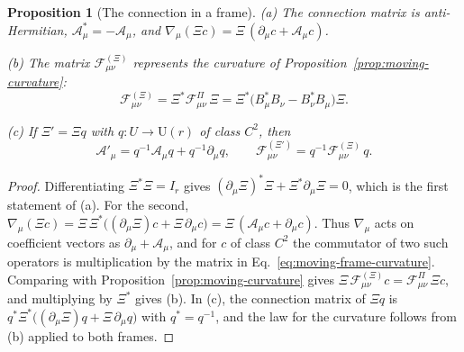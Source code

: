 \documentclass[11pt]{article}
\newtheorem{proposition}{Proposition}[section]
\theoremstyle{definition}
\begin{document}
\begin{proposition}[The connection in a frame]
\label{prop:moving-frame}
\textup{(a)} The connection matrix is anti-Hermitian, $\mathcal A_\mu^*=-\mathcal A_\mu$, and $\nabla_\mu(\Xi c)=\Xi\,(\partial_\mu c+\mathcal A_\mu c)$.

\textup{(b)} The matrix $\mathcal F^{(\Xi)}_{\mu\nu}$ represents the curvature of Proposition~\ref{prop:moving-curvature}:
\begin{equation}
 \mathcal F^{(\Xi)}_{\mu\nu}=\Xi^*\mathcal F^\Pi_{\mu\nu}\,\Xi=\Xi^*\bigl(B_\mu^*B_\nu-B_\nu^*B_\mu\bigr)\Xi .
 \label{eq:moving-frame-covariance}
\end{equation}

\textup{(c)} If $\Xi'=\Xi q$ with $q:U\to\mathrm U(r)$ of class $C^2$, then
\begin{equation}
 \mathcal A'_\mu=q^{-1}\mathcal A_\mu q+q^{-1}\partial_\mu q,\qquad
 \mathcal F^{(\Xi')}_{\mu\nu}=q^{-1}\mathcal F^{(\Xi)}_{\mu\nu}\,q .
 \label{eq:moving-change-of-frame}
\end{equation}
\end{proposition}
\begin{proof}
Differentiating $\Xi^*\Xi=I_r$ gives $(\partial_\mu\Xi)^*\Xi+\Xi^*\partial_\mu\Xi=0$, which is the first statement of (a). For the second, $\nabla_\mu(\Xi c)=\Xi\,\Xi^*\bigl((\partial_\mu\Xi)c+\Xi\,\partial_\mu c\bigr)=\Xi\,(\mathcal A_\mu c+\partial_\mu c)$. Thus $\nabla_\mu$ acts on coefficient vectors as $\partial_\mu+\mathcal A_\mu$, and for $c$ of class $C^2$ the commutator of two such operators is multiplication by the matrix in Eq.~\eqref{eq:moving-frame-curvature}. Comparing with Proposition~\ref{prop:moving-curvature} gives $\Xi\,\mathcal F^{(\Xi)}_{\mu\nu}c=\mathcal F^\Pi_{\mu\nu}\,\Xi c$, and multiplying by $\Xi^*$ gives (b). In (c), the connection matrix of $\Xi q$ is $q^*\Xi^*\bigl((\partial_\mu\Xi)q+\Xi\,\partial_\mu q\bigr)$ with $q^*=q^{-1}$, and the law for the curvature follows from (b) applied to both frames.
\end{proof}
\end{document}
